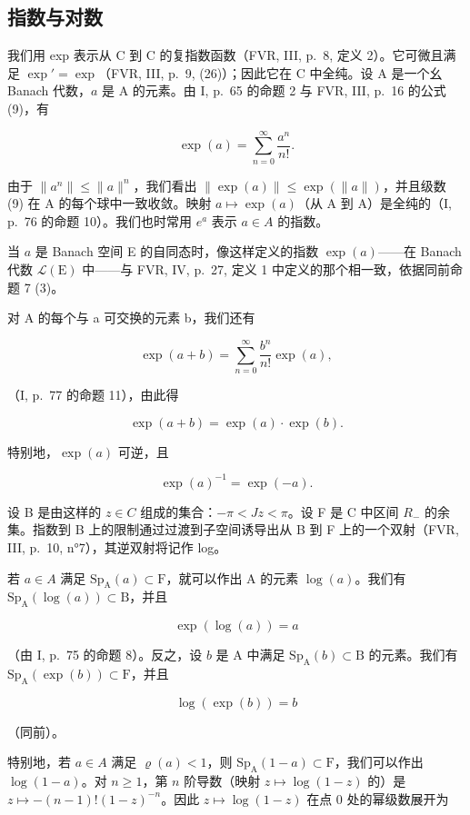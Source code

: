\subsection{指数与对数}

我们用 exp 表示从 C 到 C 的复指数函数（FVR, III, p.~8, 定义 2）。它可微且满足 \(\exp' = \exp\)（FVR, III, p.~9, (26)）；因此它在 C 中全纯。设 A 是一个幺 Banach 代数，\(a\) 是 A 的元素。由 I, p.~65 的命题 2 与 FVR, III, p.~16 的公式 (9)，有

\[
\exp (a) = \sum_ {n = 0} ^ {\infty} \frac {a ^ {n}}{n !}.\tag{9}
\]

由于 \(\|a^{n}\|\leqslant\|a\|^{n}\)，我们看出 \(\|\exp(a)\|\leqslant\exp(\|a\|)\)，并且级数 (9) 在 A 的每个球中一致收敛。映射 \(a\mapsto\exp(a)\)（从 A 到 A）是全纯的（I, p.~76 的命题 10）。我们也时常用 \(e^{a}\) 表示 \(a\in A\) 的指数。

当 \(a\) 是 Banach 空间 E 的自同态时，像这样定义的指数 \(\exp(a)\)——在 Banach 代数 \(\mathcal{L}(\mathrm{E})\) 中——与 FVR, IV, p.~27, 定义 1 中定义的那个相一致，依据同前命题 7 (3)。

对 A 的每个与 a 可交换的元素 b，我们还有

\[
\exp (a + b) = \sum_ {n = 0} ^ {\infty} \frac {b ^ {n}}{n !} \exp (a),
\]

（I, p.~77 的命题 11），由此得

\[
\exp (a + b) = \exp (a) \cdot \exp (b).\tag{10}
\]

特别地，\(\exp(a)\) 可逆，且

\[
\exp (a) ^ {- 1} = \exp (- a).\tag{11}
\]

设 B 是由这样的 \(z \in C\) 组成的集合：\(-\pi < Jz < \pi\)。设 F 是 C 中区间 \(R_{-}\) 的余集。指数到 B 上的限制通过过渡到子空间诱导出从 B 到 F 上的一个双射（FVR, III, p.~10, n°7），其逆双射将记作 log。

若 \(a \in A\) 满足 \(\mathrm{Sp}_{\mathrm{A}}(a) \subset \mathrm{F}\)，就可以作出 A 的元素 \(\log(a)\)。我们有 \(\mathrm{Sp}_{\mathrm{A}}(\log(a)) \subset \mathrm{B}\)，并且

\[
\exp (\log (a)) = a\tag{12}
\]

（由 I, p.~75 的命题 8）。反之，设 \(b\) 是 A 中满足 \(\mathrm{Sp}_{\mathrm{A}}(b) \subset \mathrm{B}\) 的元素。我们有 \(\mathrm{Sp}_{\mathrm{A}}(\exp(b)) \subset \mathrm{F}\)，并且

\[
\log (\exp (b)) = b\tag{13}
\]

（同前）。

特别地，若 \(a \in A\) 满足 \(\varrho(a) < 1\)，则 \(\mathrm{Sp}_{\mathrm{A}}(1 - a) \subset \mathrm{F}\)，我们可以作出 \(\log(1 - a)\)。对 \(n \geqslant 1\)，第 \(n\) 阶导数（映射 \(z \mapsto \log(1 - z)\) 的）是 \(z \mapsto -(n - 1)! (1 - z)^{-n}\)。因此 \(z \mapsto \log(1 - z)\) 在点 0 处的幂级数展开为

